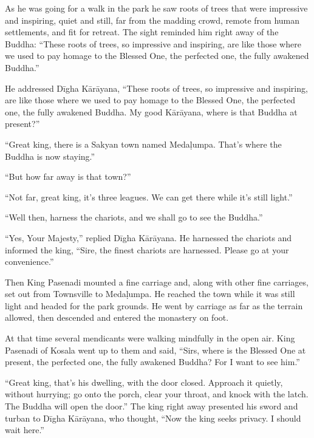 \documentclass[12pt,openany]{book}%
\begin{document}
As he was going for a walk in the park he saw roots of trees that were impressive and inspiring, quiet and still, far from the madding crowd, remote from human settlements, and fit for retreat. The sight reminded him right away of the Buddha: “These roots of trees, so impressive and inspiring, are like those where we used to pay homage to the Blessed One, the perfected one, the fully awakened Buddha.” 

He addressed \textsanskrit{Dīgha} \textsanskrit{Kārāyana}, “These roots of trees, so impressive and inspiring, are like those where we used to pay homage to the Blessed One, the perfected one, the fully awakened Buddha. My good \textsanskrit{Kārāyana}, where is that Buddha at present?” 

“Great king, there is a Sakyan town named \textsanskrit{Medaḷumpa}. That’s where the Buddha is now staying.” 

“But how far away is that town?” 

“Not far, great king, it’s three leagues. We can get there while it’s still light.” 

“Well then, harness the chariots, and we shall go to see the Buddha.” 

“Yes, Your Majesty,” replied \textsanskrit{Dīgha} \textsanskrit{Kārāyana}. He harnessed the chariots and informed the king, “Sire, the finest chariots are harnessed. Please go at your convenience.” 

Then King Pasenadi mounted a fine carriage and, along with other fine carriages, set out from Townsville to \textsanskrit{Medaḷumpa}. He reached the town while it was still light and headed for the park grounds. He went by carriage as far as the terrain allowed, then descended and entered the monastery on foot. 

At that time several mendicants were walking mindfully in the open air. King Pasenadi of Kosala went up to them and said, “Sirs, where is the Blessed One at present, the perfected one, the fully awakened Buddha? For I want to see him.” 

“Great king, that’s his dwelling, with the door closed. Approach it quietly, without hurrying; go onto the porch, clear your throat, and knock with the latch. The Buddha will open the door.” The king right away presented his sword and turban to \textsanskrit{Dīgha} \textsanskrit{Kārāyana}, who thought, “Now the king seeks privacy. I should wait here.” 
\end{document}
